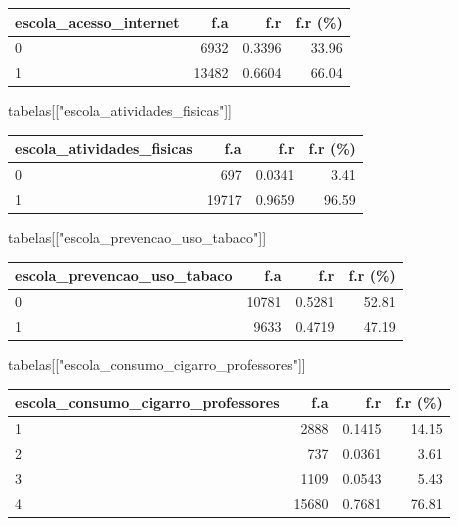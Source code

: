 \documentclass[
]{article}
\newenvironment{Shaded}{\begin{snugshade}}{\end{snugshade}}
\newcommand{\NormalTok}[1]{\textcolor[rgb]{0.00,0.23,0.31}{#1}}
\newcommand{\StringTok}[1]{\textcolor[rgb]{0.13,0.47,0.30}{#1}}
\begin{document}
\begin{longtable}[]{@{}lrrr@{}}
\toprule()
escola\_acesso\_internet & f.a & f.r & f.r (\%) \\
\midrule()
\endhead
0 & 6932 & 0.3396 & 33.96 \\
1 & 13482 & 0.6604 & 66.04 \\
\bottomrule()
\end{longtable}

\begin{Shaded}
\begin{Highlighting}[]
\NormalTok{tabelas[[}\StringTok{"escola\_atividades\_fisicas"}\NormalTok{]]}
\end{Highlighting}
\end{Shaded}

\begin{longtable}[]{@{}lrrr@{}}
\toprule()
escola\_atividades\_fisicas & f.a & f.r & f.r (\%) \\
\midrule()
\endhead
0 & 697 & 0.0341 & 3.41 \\
1 & 19717 & 0.9659 & 96.59 \\
\bottomrule()
\end{longtable}

\begin{Shaded}
\begin{Highlighting}[]
\NormalTok{tabelas[[}\StringTok{"escola\_prevencao\_uso\_tabaco"}\NormalTok{]]}
\end{Highlighting}
\end{Shaded}

\begin{longtable}[]{@{}lrrr@{}}
\toprule()
escola\_prevencao\_uso\_tabaco & f.a & f.r & f.r (\%) \\
\midrule()
\endhead
0 & 10781 & 0.5281 & 52.81 \\
1 & 9633 & 0.4719 & 47.19 \\
\bottomrule()
\end{longtable}

\begin{Shaded}
\begin{Highlighting}[]
\NormalTok{tabelas[[}\StringTok{"escola\_consumo\_cigarro\_professores"}\NormalTok{]]}
\end{Highlighting}
\end{Shaded}

\begin{longtable}[]{@{}lrrr@{}}
\toprule()
escola\_consumo\_cigarro\_professores & f.a & f.r & f.r (\%) \\
\midrule()
\endhead
1 & 2888 & 0.1415 & 14.15 \\
2 & 737 & 0.0361 & 3.61 \\
3 & 1109 & 0.0543 & 5.43 \\
4 & 15680 & 0.7681 & 76.81 \\
\bottomrule()
\end{longtable}
\end{document}
